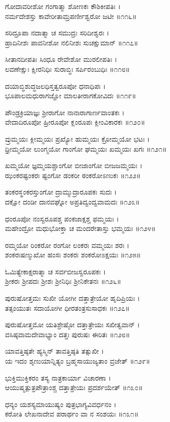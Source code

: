 ಗೋದಾವರೀಶೋ ಗಂಗಾತ್ಮಾ ಶೋಣಕಃ ಕೌಶಿಕೀಪತಿಃ ।\\
ನರ್ಮದೇಶಸ್ತು ಕಾವೇರೀತಾಮ್ರಪರ್ಣೀಶ್ವರೋ ಜಟೀ ॥೧೧೬॥

ಸರಿದ್ರೂಪಾ ನದಾತ್ಮಾ ಚ ಸಮುದ್ರಃ ಸರಿದೀಶ್ವರಃ ।\\
ಹ್ರಾದಿನೀಶಃ ಪಾವನೀಶೋ ನಲಿನೀಶಃ ಸುಚಕ್ಷುಮಾನ್ ॥೧೧೭॥

ಸೀತಾನದೀಪತಿಃ ಸಿಂಧೂ ರೇವೇಶೋ ಮುರಲೀಪತಿಃ ।\\
ಲವಣೇಕ್ಷುಃ ಕ್ಷೀರನಿಧಿಃ ಸುರಾಬ್ಧಿಃ ಸರ್ಪಿರಂಬುಧಿಃ ॥೧೧೮॥

ದಯಾಬ್ಧಿಶುದ್ಧಜಲಧಿಸ್ತತ್ವರೂಪೋ ಧನಾಧಿಪಃ ।\\
ಭೂಪಾಲಮಧುರಾಗಜ್ಞೋ ಮಾಲತೀರಾಗಕೋವಿದಃ ॥೧೧೯॥

ಪೌಂಡ್ರಕ್ರಿಯಾಜ್ಞಃ ಶ್ರೀರಾಗೋ ನಾನಾರಾಗಾರ್ಣವಾಂತಕಃ ।\\
ವೇದಾದಿರೂಪೋ ಹ್ರೀರೂಪೋ ಕ್ಲಂರೂಪಃ ಕ್ಲೀಂವಿಕಾರಕಃ ॥೧೨೦॥

ವ್ರುಮ್ಮಯಃ ಕ್ಲೀಮ್ಮಯಃ ಪ್ರಖ್ಯೋ ಹುಮ್ಮಯಃ ಕ್ರೋಮ್ಮಯೋ ಭಟಃ ।\\
ಧ್ರೀಮ್ಮಯೋ ಲುಂಗ್ಮಯೋ ಗಾಂಗೋ ಘಮ್ಮಯಃ ಖಮ್ಮಯಃ ಖಗಃ ॥೧೨೧॥

ಖಮ್ಮಯೋ ಜ್ಞಮ್ಮಯಶ್ಚಾಂಗೋ ಬೀಜಾಂಗೋ ಬೀಜಜಮ್ಮಯಃ ।\\
ಝಂಕರಷ್ಟಂಕರಃ ಷ್ಟಂಗೋ ಡಂಕರೀ ಠಂಕರೋಽಣುಕಃ ॥೧೨೨॥

ತಂಕರಸ್ಥಂಕರಸ್ತುಂಗೋ ದ್ರಾಮ್ಮುದ್ರಾರೂಪಕಃ ಸುದಃ ।\\
ದಕ್ಷೋ ದಂಡೀ ದಾನವಘ್ನೋ ಅಪ್ರತಿದ್ವಂದ್ವವಾಮದಃ ॥೧೨೩॥

ಧಂರೂಪೋ ನಂಸ್ವರೂಪಶ್ಚ ಪಂಕಜಾಕ್ಷಶ್ಚ ಫಮ್ಮಯಃ ।\\
ಮಹೇಂದ್ರೋ ಮಧುಭೋಕ್ತಾ ಚ ಮಂದರೇತಾಸ್ತು ಭಮ್ಮಯಃ ॥೧೨೪॥

ರಮ್ಮಯೋ ರಿಂಕರೋ ರಂಗೋ ಲಂಕರಃ ವಮ್ಮಯಃ ಶರಃ ।\\
ಶಂಕರಃಷಣ್ಮುಖೋ ಹಂಸಃ ಶಂಕರಃ ಶಂಕರೋಽಕ್ಷಯಃ ॥೧೨೫॥

ಓಮಿತ್ಯೇಕಾಕ್ಷರಾತ್ಮಾ ಚ ಸರ್ವಬೀಜಸ್ವರೂಪಕಃ ।\\
ಶ್ರೀಕರಃ ಶ್ರೀಪದಃ ಶ್ರೀಶಃ ಶ್ರೀನಿಧಿಃ ಶ್ರೀನಿಕೇತನಃ ॥೧೨೬॥

ಪುರುಷೋತ್ತಮಃ ಸುಖೀ ಯೋಗೀ ದತ್ತಾತ್ರೇಯೋ ಹೃದಿಪ್ರಿಯಃ ।\\
ತತ್ಸಂಯುತಃ ಸದಾಯೋಗೀ ಧೀರತಂತ್ರಸುಸಾಧಕಃ ॥೧೨೭॥

ಪುರುಷೋತ್ತಮೋ ಯತಿಶ್ರೇಷ್ಠೋ ದತ್ತಾತ್ರೇಯಃ ಸಖೀತ್ವವಾನ್ ।\\
ವಸಿಷ್ಠವಾಮದೇವಾಭ್ಯಾಂ ದತ್ತಃ ಪುರುಷಃ ಈರಿತಃ ॥೧೨೮॥

ಯಾವತ್ತಿಷ್ಠತೇ ಹ್ಯಸ್ಮಿನ್ ತಾವತ್ತಿಷ್ಠತಿ ತತ್ಸುಖೀ ।\\
ಯ ಇದಂ ಶೃಣುಯಾನ್ನಿತ್ಯಂ ಬ್ರಹ್ಮಸಾಯುಜ್ಯತಾಂ ವ್ರಜೇತ್ ॥೧೨೯॥

ಭುಕ್ತಿಮುಕ್ತಿಕರಂ ತಸ್ಯ ನಾತ್ರಕಾರ್ಯಾ ವಿಚಾರಣಾ ।\\
ಆಯುಷ್ಮತ್ಪುತ್ರಪೌತ್ರಾಂಶ್ಚ ದತ್ತಾತ್ರೇಯಃ ಪ್ರದರ್ಶಯೇತ್ ॥೧೩೦॥

ಧನ್ಯಂ ಯಶಸ್ಯಮಾಯುಷ್ಯಂ ಪುತ್ರಭಾಗ್ಯವಿವರ್ಧನಂ ।\\
ಕರೋತಿ ಲೇಖನಾದೇವ ಪರಾರ್ಥಂ ವಾ ನ ಸಂಶಯಃ ॥೧೩೧॥

